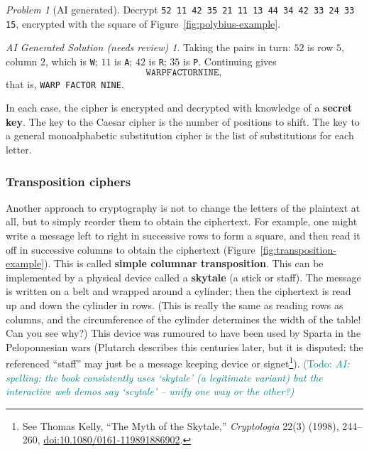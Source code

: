 \documentclass{article}
\theoremstyle{plain}
\theoremstyle{definition}
\theoremstyle{remark}
\newtheorem{problem}[theorem]{Problem}
\newtheorem*{aisolution}{AI Generated Solution (needs review)}
\numberwithin{theorem}{section}
\newcommand{\todo}[1]{\textcolor{teal}{{\sf (Todo:} {\sl{#1})}}}
\newcommand{\todo}[1]{}
\begin{document}
\begin{problem}[AI generated]
Decrypt \texttt{52 11 42 35 21 11 13 44 34 42 33 24 33 15}, encrypted with the square of Figure~\ref{fig:polybius-example}.
\end{problem}
\begin{aisolution}
Taking the pairs in turn:  $52$ is row $5$, column $2$, which is \texttt{W}; $11$ is \texttt{A}; $42$ is \texttt{R}; $35$ is \texttt{P}.  Continuing gives
\[
	\texttt{WARPFACTORNINE},
\]
that is, \texttt{WARP FACTOR NINE}.
\end{aisolution}

In each case, the cipher is encrypted and decrypted with knowledge of a \textbf{secret key}.  The key to the Caesar cipher is the number of positions to shift.  The key to a general monoalphabetic substitution cipher is the list of substitutions for each letter.

\subsubsection{Transposition ciphers}

Another approach to cryptography is not to change the letters of the plaintext at all, but to simply reorder them to obtain the ciphertext.  For example, one might write a message left to right in successive rows to form a square, and then read it off in successive columns to obtain the ciphertext (Figure~\ref{fig:transposition-example}).  This is called \textbf{simple columnar transposition}.  This can be implemented by a physical device called a \textbf{skytale} (a stick or staff).  The message is written on a belt and wrapped around a cylinder; then the ciphertext is read up and down the cylinder in rows.  (This is really the same as reading rows as columns, and the circumference of the cylinder determines the width of the table!  Can you see why?)  This device was rumoured to have been used by Sparta in the Peloponnesian wars (Plutarch describes this centuries later, but it is disputed: the referenced ``staff'' may just be a message keeping device or signet\footnote{See Thomas Kelly, ``The Myth of the Skytale,'' \emph{Cryptologia} 22(3) (1998), 244--260, \href{https://doi.org/10.1080/0161-119891886902}{doi:10.1080/0161-119891886902}.}).  \todo{AI: spelling: the book consistently uses `skytale' (a legitimate variant) but the interactive web demos say `scytale' -- unify one way or the other?}
\end{document}
